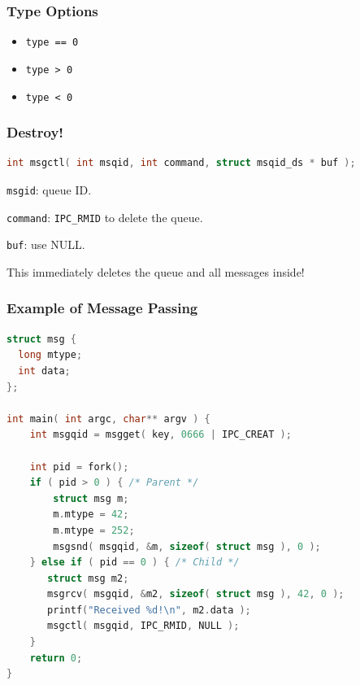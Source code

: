\begin{frame}[fragile]
\frametitle{Type Options}
\begin{itemize}
	\item \texttt{type == 0}
	\item \texttt{type > 0}
	\item \texttt{type < 0}
\end{itemize}
\end{frame}

\begin{frame}[fragile]
\frametitle{Destroy!}
\begin{lstlisting}[language=C]
int msgctl( int msqid, int command, struct msqid_ds * buf );
\end{lstlisting}

\texttt{msgid}: queue ID.

\texttt{command}:  \texttt{IPC\_RMID} to delete the queue.

\texttt{buf}: use NULL.

This immediately deletes the queue and all messages inside!

\end{frame}


\begin{frame}[fragile]
\frametitle{Example of Message Passing}

\begin{lstlisting}[language=C]
struct msg {
  long mtype;
  int data;
};
  
int main( int argc, char** argv ) {
    int msgqid = msgget( key, 0666 | IPC_CREAT );

    int pid = fork();
    if ( pid > 0 ) { /* Parent */
        struct msg m;
        m.mtype = 42;
        m.mtype = 252;
        msgsnd( msgqid, &m, sizeof( struct msg ), 0 ); 
    } else if ( pid == 0 ) { /* Child */
       struct msg m2;
       msgrcv( msgqid, &m2, sizeof( struct msg ), 42, 0 );
       printf("Received %d!\n", m2.data );
       msgctl( msgqid, IPC_RMID, NULL );
    }   
    return 0;
}
\end{lstlisting}


\end{frame}








